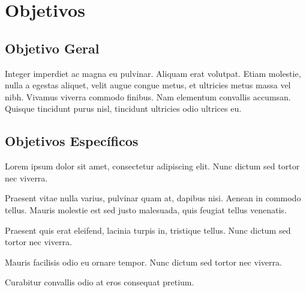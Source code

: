 \chapter{Objetivos}
\label{cap:objetivos}

\section{Objetivo Geral}
\label{sec:objetivo-geral}

Integer imperdiet ac magna eu pulvinar. Aliquam erat volutpat. Etiam molestie, nulla a egestas aliquet, velit augue congue metus, et ultricies metus massa vel nibh. Vivamus viverra commodo finibus. Nam elementum convallis accumsan. Quisque tincidunt purus nisl, tincidunt ultricies odio ultrices eu.

\section{Objetivos Específicos}
\label{sec:objetivos-especificos}

\begin{alineas}
	\item Lorem ipsum dolor sit amet, consectetur adipiscing elit. Nunc dictum sed tortor nec viverra.
	\item Praesent vitae nulla varius, pulvinar quam at, dapibus nisi. Aenean in commodo tellus. Mauris molestie est sed justo malesuada, quis feugiat tellus venenatis.
	\item Praesent quis erat eleifend, lacinia turpis in, tristique tellus. Nunc dictum sed tortor nec viverra.
	\item Mauris facilisis odio eu ornare tempor. Nunc dictum sed tortor nec viverra.
	\item Curabitur convallis odio at eros consequat pretium.
\end{alineas}